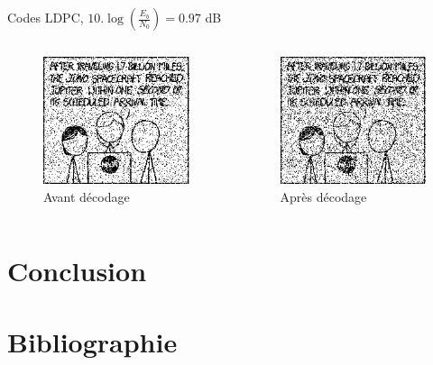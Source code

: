 \documentclass[11pt]{beamer}
\begin{document}
\begin{frame}{Codes LDPC, $10.\log(\frac{E_b}{N_0}) = 0.97$ dB}
	\begin{columns}
		\begin{column}{.5\textwidth}
			\begin{figure}
				\includegraphics[scale=0.6]{ldpc_basic_noisy_80}\\
				Avant d\'ecodage
			\end{figure}
		\end{column}
		\begin{column}{.5\textwidth}
			\begin{figure}
				\includegraphics[scale=0.6]{ldpc_basic_decoded_80}\\
				Apr\`es d\'ecodage
			\end{figure}
		\end{column}
	\end{columns}
\end{frame}


\section*{Conclusion}



\appendix


\section{Bibliographie}
\end{document}
